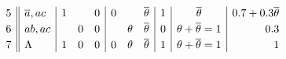 \documentclass[x11names]{tlp}
\begin{document}
\begin{example}
\begin{equation*}
\begin{array}{c||l|ccc|ccc|c|c|r}
				5
				  & \overline{a}, ac
				  & 1                                         &        & 0
				  & 0                                         &        & \overline{\theta}
				  & 1
				  & \overline{\theta}
				  & 0.7 + 0.3\overline{\theta}
				\\[2pt]
				6
				  & ab, ac
				  &                                           & 0      & 0
				  &                                           & \theta & \overline{\theta}
				  & 0
				  & \theta + \overline{\theta} = 1
				  & 0.3
				\\[2pt]
				7
				  & \Lambda
				  & 1                                         & 0      & 0
				  & 0                                         & \theta & \overline{\theta}
				  & 1
				  & \theta + \overline{\theta} = 1
				  & 1
			\end{array}
		\end{equation*}


\end{example}
\end{document}
